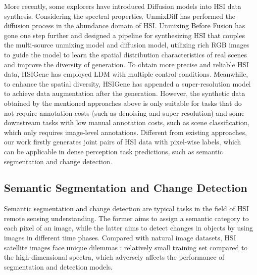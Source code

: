 More recently, some explorers have introduced Diffusion models into HSI data synthesis.
Considering the spectral properties, UnmixDiff \cite{yu2024unmixdiff} has performed the diffusion process in the abundance domain of HSI. Unmixing Before Fusion \cite{yu2024unmixing} has gone one step further and designed a pipeline for synthesizing HSI that couples the multi-source unmixing model and diffusion model, utilizing rich RGB images to guide the model to learn the spatial distribution characteristics of real scenes and improve the diversity of generation. To obtain more precise and reliable HSI data, HSIGene \cite{hsigene} has employed LDM with multiple control conditions. Meanwhile, to enhance the spatial diversity, HSIGene has appended a super-resolution model to achieve data augmentation after the generation. However, the synthetic data obtained by the mentioned approaches above is only suitable for tasks that do not require annotation costs (such as denoising and super-resolution) and some downstream tasks with low manual annotation costs, such as scene classification, which only requires image-level annotations. Different from existing approaches, our work firstly generates joint pairs of HSI data with pixel-wise labels, which can be applicable in dense perception task predictions, such as semantic segmentation and change detection.

\subsection{Semantic Segmentation and Change Detection}
Semantic segmentation and change detection are typical tasks in the field of HSI remote sensing understanding. The former aims to assign a semantic category to each pixel of an image, while the latter aims to detect changes in objects by using images in different time phases. Compared with natural image datasets, HSI satellite images face unique dilemmas \cite{he2017recent,li2019deep}: relatively small training set compared to the high-dimensional spectra, which adversely affects the performance of segmentation and detection models. 

